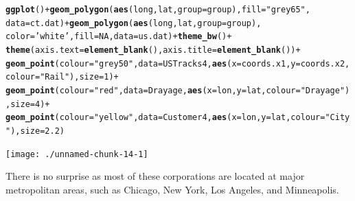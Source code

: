 \documentclass{article}\usepackage[]{graphicx}\usepackage[]{color}
\makeatletter
\newcommand{\hlnum}[1]{\textcolor[rgb]{0.686,0.059,0.569}{#1}}%
\newcommand{\hlstr}[1]{\textcolor[rgb]{0.192,0.494,0.8}{#1}}%
\newcommand{\hlopt}[1]{\textcolor[rgb]{0,0,0}{#1}}%
\newcommand{\hlstd}[1]{\textcolor[rgb]{0.345,0.345,0.345}{#1}}%
\newcommand{\hlkwc}[1]{\textcolor[rgb]{0.333,0.667,0.333}{#1}}%
\newcommand{\hlkwd}[1]{\textcolor[rgb]{0.737,0.353,0.396}{\textbf{#1}}}%
\newenvironment{kframe}{%
 \def\at@end@of@kframe{}%
 \ifinner\ifhmode%
  \def\at@end@of@kframe{\end{minipage}}%
  \begin{minipage}{\columnwidth}%
 \fi\fi%
 \def\FrameCommand##1{\hskip\@totalleftmargin \hskip-\fboxsep
 \colorbox{shadecolor}{##1}\hskip-\fboxsep
     \hskip-\linewidth \hskip-\@totalleftmargin \hskip\columnwidth}%
 \MakeFramed {\advance\hsize-\width
   \@totalleftmargin\z@ \linewidth\hsize
   \@setminipage}}%
 {\par\unskip\endMakeFramed%
 \at@end@of@kframe}
\newenvironment{knitrout}{}{} %
\makeatother
\begin{document}
\begin{knitrout}
\color{fgcolor}\begin{kframe}
\begin{alltt}
\hlkwd{ggplot}\hlstd{()} \hlopt{+} \hlkwd{geom_polygon}\hlstd{(}\hlkwd{aes}\hlstd{(long,lat,} \hlkwc{group}\hlstd{=group),} \hlkwc{fill}\hlstd{=}\hlstr{"grey65"}\hlstd{,}
  \hlkwc{data}\hlstd{=ct.dat)} \hlopt{+} \hlkwd{geom_polygon}\hlstd{(}\hlkwd{aes}\hlstd{(long,lat,} \hlkwc{group}\hlstd{=group),}
  \hlkwc{color}\hlstd{=}\hlstr{'white'}\hlstd{,} \hlkwc{fill}\hlstd{=}\hlnum{NA}\hlstd{,} \hlkwc{data}\hlstd{=us.dat)} \hlopt{+} \hlkwd{theme_bw}\hlstd{()} \hlopt{+}
  \hlkwd{theme}\hlstd{(}\hlkwc{axis.text} \hlstd{=} \hlkwd{element_blank}\hlstd{(),} \hlkwc{axis.title}\hlstd{=}\hlkwd{element_blank}\hlstd{())} \hlopt{+}
  \hlkwd{geom_point}\hlstd{(}\hlkwc{colour}\hlstd{=}\hlstr{"grey50"}\hlstd{,}\hlkwc{data}\hlstd{=USTracks4,} \hlkwd{aes}\hlstd{(}\hlkwc{x}\hlstd{=coords.x1,}\hlkwc{y}\hlstd{=coords.x2,}\hlkwc{colour}\hlstd{=}\hlstr{"Rail"}\hlstd{),} \hlkwc{size} \hlstd{=} \hlnum{1}\hlstd{)} \hlopt{+}
  \hlkwd{geom_point}\hlstd{(}\hlkwc{colour}\hlstd{=}\hlstr{"red"}\hlstd{,}\hlkwc{data}\hlstd{=Drayage,} \hlkwd{aes}\hlstd{(}\hlkwc{x}\hlstd{=lon,}\hlkwc{y}\hlstd{=lat,}\hlkwc{colour}\hlstd{=}\hlstr{"Drayage"}\hlstd{),}\hlkwc{size} \hlstd{=} \hlnum{4}\hlstd{)} \hlopt{+}
  \hlkwd{geom_point}\hlstd{(}\hlkwc{colour}\hlstd{=}\hlstr{"yellow"}\hlstd{,}\hlkwc{data}\hlstd{=Customer4,} \hlkwd{aes}\hlstd{(}\hlkwc{x}\hlstd{=lon,}\hlkwc{y}\hlstd{=lat,}\hlkwc{colour}\hlstd{=}\hlstr{"City"}\hlstd{),}\hlkwc{size} \hlstd{=} \hlnum{2.2}\hlstd{)}
\end{alltt}
\end{kframe}

{\centering \texttt{[image: ./unnamed-chunk-14-1]} 

}



\end{knitrout}
\newpage


There is no surprise as most of these corporations are located at major metropolitan areas, such as Chicago, New York, Los Angeles, and Minneapolis.
\end{document}

